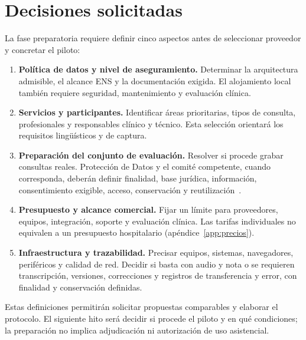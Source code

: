 \section{Decisiones solicitadas}
\label{sec:decision}
La fase preparatoria requiere definir cinco aspectos antes de seleccionar proveedor y concretar el piloto:
\begin{enumerate}
\item \textbf{Política de datos y nivel de aseguramiento.} Determinar la arquitectura admisible, el alcance ENS y la documentación exigida. El alojamiento local también requiere seguridad, mantenimiento y evaluación clínica.
\item \textbf{Servicios y participantes.} Identificar áreas prioritarias, tipos de consulta, profesionales y responsables clínico y técnico. Esta selección orientará los requisitos lingüísticos y de captura.
\item \textbf{Preparación del conjunto de evaluación.} Resolver si procede grabar consultas reales. Protección de Datos y el comité competente, cuando corresponda, deberán definir finalidad, base jurídica, información, consentimiento exigible, acceso, conservación y reutilización~\cite{rgpd2016}.
\item \textbf{Presupuesto y alcance comercial.} Fijar un límite para proveedores, equipos, integración, soporte y evaluación clínica. Las tarifas individuales no equivalen a un presupuesto hospitalario (apéndice~\ref{app:precios}).
\item \textbf{Infraestructura y trazabilidad.} Precisar equipos, sistemas, navegadores, periféricos y calidad de red. Decidir si basta con audio y nota o se requieren transcripción, versiones, correcciones y registros de transferencia y error, con finalidad y conservación definidas.
\end{enumerate}

Estas definiciones permitirán solicitar propuestas comparables y elaborar el protocolo. El siguiente hito será decidir si procede el piloto y en qué condiciones; la preparación no implica adjudicación ni autorización de uso asistencial.
